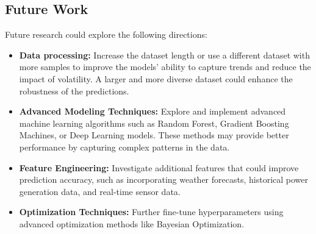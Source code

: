\subsection{Future Work}

Future research could explore the following directions:

\begin{itemize}
    \item \textbf{Data processing:} Increase the dataset length or use a different dataset with more samples to improve the models' ability to capture trends and reduce the impact of volatility. A larger and more diverse dataset could enhance the robustness of the predictions.
    \item \textbf{Advanced Modeling Techniques:} Explore and implement advanced machine learning algorithms such as Random Forest, Gradient Boosting Machines, or Deep Learning models. These methods may provide better performance by capturing complex patterns in the data.
    \item \textbf{Feature Engineering:} Investigate additional features that could improve prediction accuracy, such as incorporating weather forecasts, historical power generation data, and real-time sensor data.
    \item \textbf{Optimization Techniques:} Further fine-tune hyperparameters using advanced optimization methods like Bayesian Optimization.
\end{itemize}

